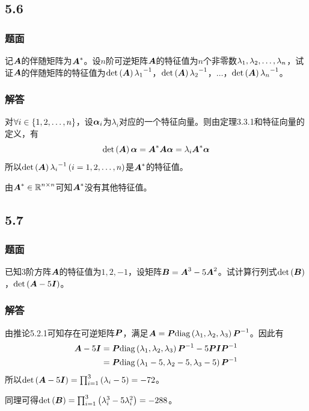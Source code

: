 \documentclass{beamer}
\begin{document}
\subsection*{5.6}
\begin{frame}
    \frametitle{题面}
    记\(\mata\)的伴随矩阵为\(\mata^*\)。设\(n\)阶可逆矩阵\(\mata\)的特征值为\(n\)个非零数\(\enums{\lambda}{n}\)，试证\(\mata\)的伴随矩阵的特征值为\(\det{\mata}\inv{\lambda_1}\)，\(\det{\mata}\inv{\lambda_2}\)，\(\dots\)，\(\det{\mata}\inv{\lambda_n}\)。
\end{frame}

\begin{frame}
    \frametitle{解答}
    对\(\forall i\in\setof{1,2,\dots,n}\)，设\(\vecal_i\)为\(\lambda_i\)对应的一个特征向量。则由定理3.3.1和特征向量的定义，有
    \begin{equation*}
        \det{\mata}\vecal=\mata^*\mata\vecal=\lambda_i\mata^*\vecal
    \end{equation*}
    \pause
    所以\(\det{\mata}\inv{\lambda_i}\spar{i=1,2,\dots,n}\)是\(\mata^*\)的特征值。

    由\(\mata^*\in\rea^{n\times n}\)可知\(\mata^*\)没有其他特征值。
\end{frame}

\subsection*{5.7}
\begin{frame}
    \frametitle{题面}
    已知\(3\)阶方阵\(\mata\)的特征值为\(1,2,-1\)，设矩阵\(\matb=\mata^3-5\mata^2\)。试计算行列式\(\det{\matb}\)，\(\det{\mata-5\mati}\)。
\end{frame}

\begin{frame}
    \frametitle{解答}

    由推论5.2.1可知存在可逆矩阵\(\matp\)，满足\(\mata=\matp\diag{\lambda_1,\lambda_2,\lambda_3}\inv{\matp}\)。因此有
    \begin{align*}
        \mata-5\mati & =\matp\diag{\lambda_1,\lambda_2,\lambda_3}\inv{\matp}-5\matp\mati\inv{\matp} \\
                     & =\matp\diag{\lambda_1-5,\lambda_2-5,\lambda_3-5}\inv{\matp}
    \end{align*}
    \pause
    所以\(\det{\mata-5\mati}=\prod_{i=1}^3\spar{\lambda_i-5}=-72\)。

    同理可得\(\det{\matb}=\prod_{i=1}^3\spar{\lambda_i^3-5\lambda_i^2}=-288\)。

\end{frame}
\end{document}

